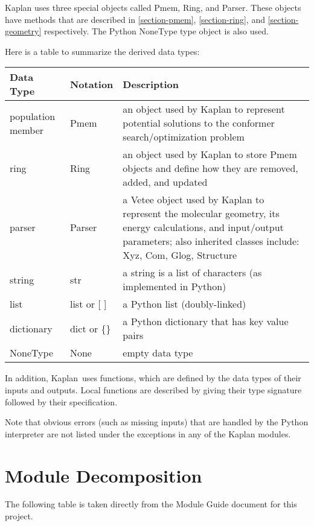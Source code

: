 \documentclass[12pt, titlepage]{article}
\newcommand{\progname}{Kaplan}
\begin{document}
\progname{} uses three special objects called Pmem, Ring, and Parser. These 
objects have methods that are described in \ref{section-pmem}, 
\ref{section-ring}, and \ref{section-geometry} respectively. The Python 
NoneType type object is also used.

Here is a table to summarize the derived data types:

\begin{center}
\renewcommand{\arraystretch}{1.2}
\noindent 
\begin{tabular}{l l p{7.5cm}} 
\toprule 
\textbf{Data Type} & \textbf{Notation} & \textbf{Description}\\ 
\midrule
population member & Pmem & an object used by \progname{} to represent potential 
solutions to the conformer search/optimization problem \\
ring & Ring & an object used by \progname{} to store Pmem objects and define 
how they are removed, added, and updated \\
parser & Parser & a Vetee object used by \progname{} to represent the molecular 
geometry, its energy calculations, and input/output parameters; also inherited 
classes include: Xyz, Com, Glog, Structure \\
string & str & a string is a list of characters (as implemented in Python) \\
list & list or [ ] & a Python list (doubly-linked) \\
dictionary & dict or \{\} & a Python dictionary that has key value pairs \\
NoneType & None & empty data type \\
\bottomrule
\end{tabular} 
\end{center}

In addition, \progname \ uses functions, which
are defined by the data types of their inputs and outputs. Local functions are
described by giving their type signature followed by their specification.

Note that obvious errors (such as missing inputs) that are handled by the 
Python interpreter are not listed under the exceptions in any of the 
\progname{} modules.

\section{Module Decomposition}

The following table is taken directly from the Module Guide document for this project.
\end{document}
